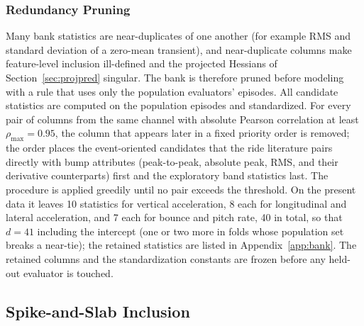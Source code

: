\documentclass[lettersize,journal]{IEEEtran}
\begin{document}
\subsubsection{Redundancy Pruning}
Many bank statistics are near-duplicates of one another (for example RMS and standard deviation of a zero-mean transient), and near-duplicate columns make feature-level inclusion ill-defined and the projected Hessians of Section~\ref{sec:projpred} singular. The bank is therefore pruned before modeling with a rule that uses only the population evaluators' episodes. All candidate statistics are computed on the population episodes and standardized. For every pair of columns from the same channel with absolute Pearson correlation at least $\rho_{\max}=0.95$, the column that appears later in a fixed priority order is removed; the order places the event-oriented candidates that the ride literature pairs directly with bump attributes (peak-to-peak, absolute peak, RMS, and their derivative counterparts) first and the exploratory band statistics last. The procedure is applied greedily until no pair exceeds the threshold. On the present data it leaves 10 statistics for vertical acceleration, 8 each for longitudinal and lateral acceleration, and 7 each for bounce and pitch rate, 40 in total, so that $d=41$ including the intercept (one or two more in folds whose population set breaks a near-tie); the retained statistics are listed in Appendix~\ref{app:bank}. The retained columns and the standardization constants are frozen before any held-out evaluator is touched.

\subsection{Spike-and-Slab Inclusion}
\label{sec:pip}
\end{document}
